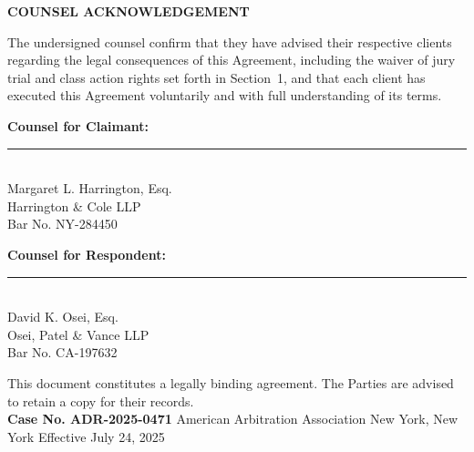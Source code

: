 \documentclass[11pt,a4paper]{article}
\begin{document}
\begin{tcolorbox}[
  enhanced,
  colback=CloudGray,
  colframe=BorderGray,
  arc=3pt,
  boxrule=0.6pt,
  left=10pt, right=10pt, top=8pt, bottom=8pt
]
  \sffamily\small
  \textbf{\color{NavyDeep}\faLock\quad COUNSEL ACKNOWLEDGEMENT}

  \vspace{5pt}
  The undersigned counsel confirm that they have advised their respective clients
  regarding the legal consequences of this Agreement, including the waiver of jury
  trial and class action rights set forth in Section~1, and that each client has
  executed this Agreement voluntarily and with full understanding of its terms.

  \vspace{8pt}
  \noindent
  \begin{minipage}[t]{0.45\linewidth}
    {\footnotesize\color{MidGray}\textbf{Counsel for Claimant:}}\\[12pt]
    \rule{5.5cm}{0.4pt}\\{}%
    {\footnotesize\color{MidGray}Margaret L. Harrington, Esq.}\\
    {\footnotesize\color{MidGray}Harrington \& Cole LLP}\\
    {\footnotesize\color{MidGray}Bar No. NY-284450}
  \end{minipage}%
  \hfill
  \begin{minipage}[t]{0.45\linewidth}
    {\footnotesize\color{MidGray}\textbf{Counsel for Respondent:}}\\[12pt]
    \rule{5.5cm}{0.4pt}\\{}%
    {\footnotesize\color{MidGray}David K. Osei, Esq.}\\
    {\footnotesize\color{MidGray}Osei, Patel \& Vance LLP}\\
    {\footnotesize\color{MidGray}Bar No. CA-197632}
  \end{minipage}
\end{tcolorbox}

\vspace{6mm}

\begin{center}
  \sffamily\scriptsize\color{MidGray}
  This document constitutes a legally binding agreement. The Parties are advised
  to retain a copy for their records.\\[2pt]
  \textbf{Case No. ADR-2025-0471} \textbullet{}
  American Arbitration Association \textbullet{}
  New York, New York \textbullet{}
  Effective July 24, 2025
\end{center}
\end{document}

